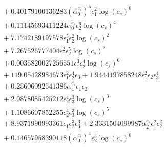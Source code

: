 \documentclass[10pt]{article}
\begin{document}
\begin{align*}
&{}  + 0.40179100136283 \left(\alpha_{0}^{c_s}\right)^{5} \epsilon_{1}^{2} \log{\left(c_{s} \right)}^{6} \\
&{}  + 0.11145693411224 \alpha_{0}^{c_s} \epsilon_{2}^{6} \log{\left(c_{s} \right)}^{4} \\
&{}  + 7.1742189197578 \epsilon_{1}^{5} \epsilon_{2}^{2} \log{\left(c_{s} \right)}^{2} \\
&{}  + 7.267526777404 \epsilon_{1}^{2} \epsilon_{2}^{5} \log{\left(c_{s} \right)}^{2} \\
&{}  + 0.0035820027256551 \epsilon_{1}^{3} \epsilon_{2}^{4} \log{\left(c_{s} \right)}^{6} \\
&{}  + 119.05428984673 \epsilon_{1}^{2} \epsilon_{2}^{4} \epsilon_{3} + 1.9444197858248 \epsilon_{1}^{2} \epsilon_{2} \epsilon_{3}^{4} \\
&{}  + 0.25606092541386 \alpha_{4}^{c_s} \epsilon_{1} \epsilon_{2} \\
&{}  + 2.0878085425212 \epsilon_{2}^{4} \epsilon_{3}^{3} \log{\left(c_{s} \right)}^{3} \\
&{}  + 1.1086607852255 \epsilon_{2}^{4} \epsilon_{3}^{3} \log{\left(c_{s} \right)}^{5} \\
&{}  + 8.9371990993361 \epsilon_{1} \epsilon_{2}^{3} \epsilon_{3}^{3} + 2.3331504099987 \alpha_{2}^{c_s} \epsilon_{1}^{2} \epsilon_{2}^{2} \\
&{}  + 0.14657958390118 \left(\alpha_{0}^{c_s}\right)^{4} \epsilon_{2}^{3} \log{\left(c_{s} \right)}^{6}
\end{align*}
\end{document}
